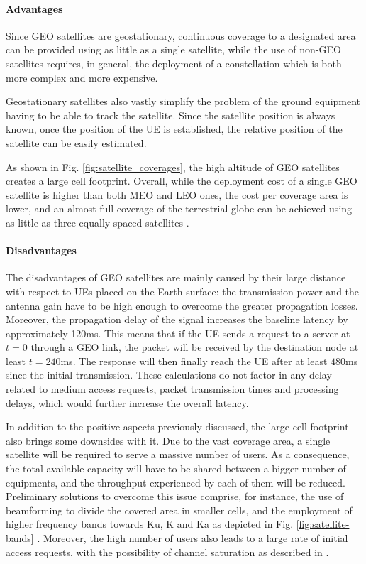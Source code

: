 \paragraph{Advantages}    
Since \ac{GEO} satellites are geostationary, continuous coverage to a designated area can be provided using as little as a single satellite, while the use of non-\ac{GEO} satellites requires, in general, the deployment of a constellation which is both more complex and more expensive. 

Geostationary satellites also vastly simplify the problem of the ground equipment having to be able to track the satellite. Since the satellite position is always known, once the position of the \ac{UE} is established, the relative position of the satellite can be easily estimated.

As shown in Fig. \ref{fig:satellite_coverages}, the high altitude of \ac{GEO} satellites creates a large cell footprint. Overall, while the deployment cost of a single \ac{GEO} satellite is higher than both \ac{MEO} and \ac{LEO} ones, the cost per coverage area is lower, and an almost full coverage of the terrestrial globe can be achieved using as little as three equally spaced satellites \cite{types-of-orbits-esa}.

\paragraph{Disadvantages}
The disadvantages of \ac{GEO} satellites are mainly caused by their large distance with respect to \ac{UE}s placed on the Earth surface: the transmission power and the antenna gain have to be high enough to overcome the greater propagation losses. Moreover, the propagation delay of the signal increases the baseline latency by approximately 120ms. This means that if the \ac{UE} sends a request to a server at $t=0$ through a \ac{GEO} link, the packet will be received by the destination node at least $t=240$ms. The response will then finally reach the \ac{UE} after at least $480$ms since the initial transmission. These calculations do not factor in any delay related to medium access requests, packet transmission times and processing delays, which would further increase the overall latency.

In addition to the positive aspects previously discussed, the large cell footprint also brings some downsides with it. Due to the vast coverage area, a single satellite will be required to serve a massive number of users. As a consequence, the total available capacity will have to be shared between a bigger number of equipments, and the throughput experienced by each of them will be reduced. Preliminary solutions to overcome this issue comprise, for instance, the use of beamforming to divide the covered area in smaller cells, and the employment of higher frequency bands towards Ku, K and Ka as depicted in Fig. \ref{fig:satellite-bands} \cite{advances-comm-sat-sys}.
Moreover, the high number of users also leads to a large rate of initial access requests, with the possibility of channel saturation as described in \cite{3gpp-tr-38.811}.

